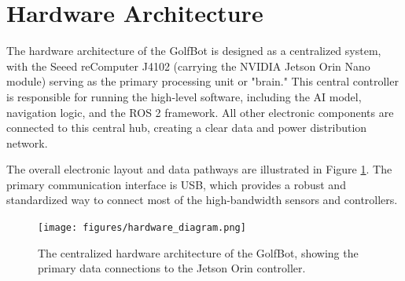 \section{Hardware Architecture}
\label{sec:hardware_architecture}
The hardware architecture of the GolfBot is designed as a centralized system, with the Seeed reComputer J4102 (carrying the NVIDIA Jetson Orin Nano module) serving as the primary processing unit or "brain." This central controller is responsible for running the high-level software, including the AI model, navigation logic, and the ROS 2 framework. All other electronic components are connected to this central hub, creating a clear data and power distribution network.

The overall electronic layout and data pathways are illustrated in Figure \ref{fig:hardware_diagram}. The primary communication interface is USB, which provides a robust and standardized way to connect most of the high-bandwidth sensors and controllers.

\begin{figure}[h!]
    \centering
    \texttt{[image: figures/hardware\_diagram.png]}
    \caption{The centralized hardware architecture of the GolfBot, showing the primary data connections to the Jetson Orin controller.}
    \label{fig:hardware_diagram}
\end{figure}

